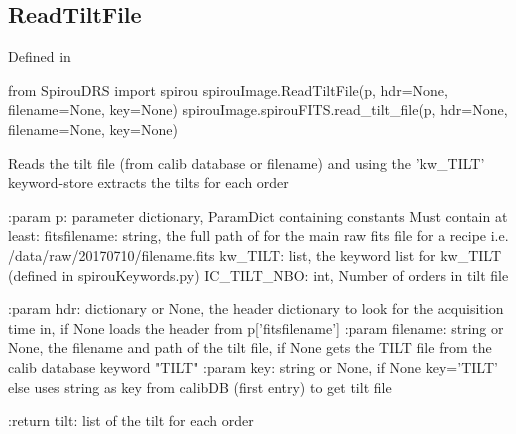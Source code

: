 \begin{minipage}{\textwidth}
\subsection{ReadTiltFile}

Defined in \spirouImage{}

\begin{pythonbox}
from SpirouDRS import spirou
spirouImage.ReadTiltFile(p, hdr=None, filename=None, key=None)
spirouImage.spirouFITS.read_tilt_file(p, hdr=None, filename=None, key=None)
\end{pythonbox}

\begin{pythondocstring}
Reads the tilt file (from calib database or filename) and using the
'kw_TILT' keyword-store extracts the tilts for each order

:param p: parameter dictionary, ParamDict containing constants
    Must contain at least:
            fitsfilename: string, the full path of for the main raw fits
                          file for a recipe
                          i.e. /data/raw/20170710/filename.fits
            kw_TILT: list, the keyword list for kw_TILT (defined in
                     spirouKeywords.py)
            IC_TILT_NBO: int, Number of orders in tilt file

:param hdr: dictionary or None, the header dictionary to look for the
                 acquisition time in, if None loads the header from
                 p['fitsfilename']
:param filename: string or None, the filename and path of the tilt file,
                 if None gets the TILT file from the calib database
                 keyword "TILT"
:param key: string or None, if None key='TILT' else uses string as key
            from calibDB (first entry) to get tilt file

:return tilt: list of the tilt for each order
\end{pythondocstring}
\end{minipage}


